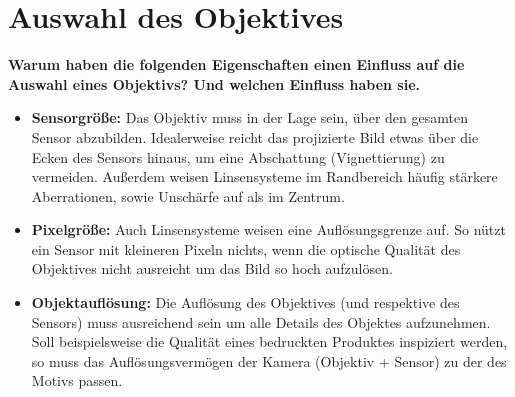 \documentclass[a4paper]{article}
\begin{document}
	\section{Auswahl des Objektives}
	\textbf{Warum haben die folgenden Eigenschaften einen Einfluss auf die Auswahl eines Objektivs?
		Und welchen Einfluss haben sie.}\\
	\begin{itemize}
		\item \textbf{Sensorgröße:} Das Objektiv muss in der Lage sein, über den gesamten Sensor abzubilden. Idealerweise reicht das projizierte Bild etwas über die Ecken des Sensors hinaus, um eine Abschattung (Vignettierung) zu vermeiden. Außerdem weisen Linsensysteme im Randbereich häufig stärkere Aberrationen, sowie Unschärfe auf als im Zentrum.\\
		\item \textbf{Pixelgröße:} Auch Linsensysteme weisen eine Auflösungsgrenze auf. So nützt ein Sensor mit kleineren Pixeln nichts, wenn die optische Qualität des Objektives nicht ausreicht um das Bild so hoch aufzulösen.\\
		\item \textbf{Objektauflösung:} Die Auflösung des Objektives (und respektive des Sensors) muss ausreichend sein um alle Details des Objektes aufzunehmen. Soll beispielsweise die Qualität eines bedruckten Produktes inspiziert werden, so muss das Auflösungsvermögen der Kamera (Objektiv + Sensor) zu der des Motivs passen.\\
	\end{itemize}

\newpage
\end{document}

